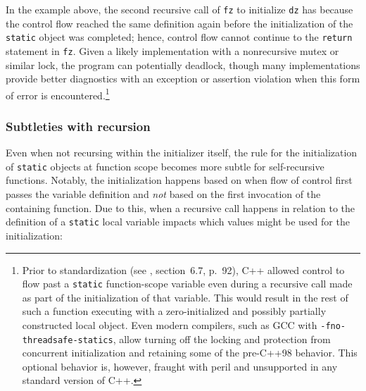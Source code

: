 \noindent In the example above, the second recursive call of \lstinline!fz!
to initialize \lstinline!dz! has  because the control flow reached the
same definition again before the initialization of the
\lstinline!static! object was completed; hence, control flow cannot continue to the
\lstinline!return! statement in \lstinline!fz!. Given a likely implementation
with a nonrecursive mutex or similar lock, the program can potentially deadlock,
though many implementations provide better diagnostics with an exception or
assertion violation when this form of error is encountered.{\cprotect\footnote{Prior to standardization (see \cite{ellis90}, section~6.7, p.~92),
C++ allowed control to flow past a
\lstinline!static! function-scope variable even during a recursive call
made as part of the initialization of that variable. This would result
in the rest of such a function executing with a zero-initialized and
possibly partially constructed local object. Even modern compilers,
such as GCC with \lstinline!-fno-threadsafe-statics!, allow turning off
the locking and protection from concurrent initialization and
retaining some of the pre-C++98 behavior. This optional behavior is,
however, fraught with peril and unsupported in any standard version of
  C++.}}

\subsubsection[Subtleties with recursion]{Subtleties with recursion}\label{subtleties-with-recursion}

Even when not recursing within the initializer itself, the rule for the
initialization of \lstinline!static! objects at function
scope becomes more subtle for self-recursive functions.
Notably, the initialization happens based
on when flow of control first passes the variable definition and \emph{not}
based on the first invocation of the containing function.  Due to this, when a recursive call
happens in relation to the definition of a \lstinline!static! local variable
impacts which values might be used for the initialization:\pagebreak%


